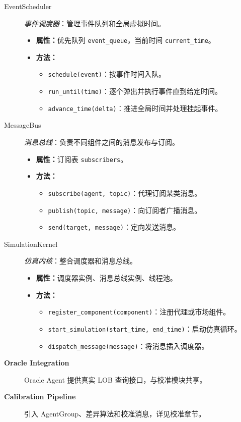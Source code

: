\begin{description}
  \item[EventScheduler] \emph{事件调度器}：管理事件队列和全局虚拟时间。
  \begin{itemize}
    \item \textbf{属性：}优先队列 \verb|event_queue|，当前时间 \verb|current_time|。
    \item \textbf{方法：}
      \begin{itemize}
        \item \verb|schedule(event)|：按事件时间入队。
        \item \verb|run_until(time)|：逐个弹出并执行事件直到给定时间。
        \item \verb|advance_time(delta)|：推进全局时间并处理挂起事件。
      \end{itemize}
  \end{itemize}
  \item[MessageBus] \emph{消息总线}：负责不同组件之间的消息发布与订阅。
  \begin{itemize}
    \item \textbf{属性：}订阅表 \verb|subscribers|。
    \item \textbf{方法：}
      \begin{itemize}
        \item \verb|subscribe(agent, topic)|：代理订阅某类消息。
        \item \verb|publish(topic, message)|：向订阅者广播消息。
        \item \verb|send(target, message)|：定向发送消息。
      \end{itemize}
  \end{itemize}
  \item[SimulationKernel] \emph{仿真内核}：整合调度器和消息总线。
  \begin{itemize}
    \item \textbf{属性：}调度器实例、消息总线实例、线程池。
    \item \textbf{方法：}
      \begin{itemize}
        \item \verb|register_component(component)|：注册代理或市场组件。
        \item \verb|start_simulation(start_time, end_time)|：启动仿真循环。
        \item \verb|dispatch_message(message)|：将消息插入调度器。
      \end{itemize}
  \end{itemize}
  \item[\textbf{Oracle Integration}] Oracle Agent 提供真实 LOB 查询接口，与校准模块共享。
  \item[\textbf{Calibration Pipeline}] 引入 AgentGroup、差异算法和校准消息，详见校准章节。
\end{description}

